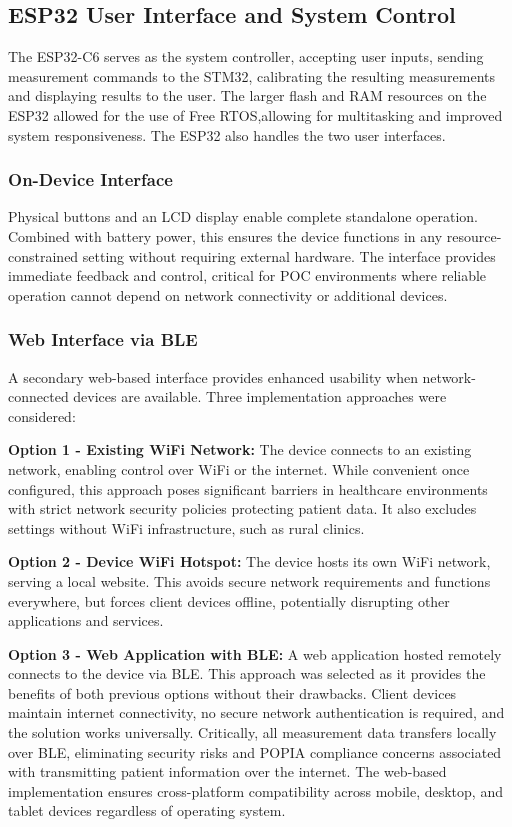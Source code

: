 \subsection{ESP32 User Interface and System Control}
The ESP32-C6 serves as the system controller, accepting user inputs, sending measurement commands to the STM32, calibrating the resulting measurements and displaying results to the user. The larger flash and RAM resources on the ESP32 allowed for the use of Free RTOS,allowing for multitasking and improved system responsiveness. The ESP32 also handles the two user interfaces.

\subsubsection{On-Device Interface}
Physical buttons and an LCD display enable complete standalone operation. Combined with battery power, this ensures the device functions in any resource-constrained setting without requiring external hardware. The interface provides immediate feedback and control, critical for \ac{POC} environments where reliable operation cannot depend on network connectivity or additional devices.

\subsubsection{Web Interface via BLE}
A secondary web-based interface provides enhanced usability when network-connected devices are available. Three implementation approaches were considered:

\textbf{Option 1 - Existing WiFi Network:} The device connects to an existing network, enabling control over WiFi or the internet. While convenient once configured, this approach poses significant barriers in healthcare environments with strict network security policies protecting patient data. It also excludes settings without WiFi infrastructure, such as rural clinics.

\textbf{Option 2 - Device WiFi Hotspot:} The device hosts its own WiFi network, serving a local website. This avoids secure network requirements and functions everywhere, but forces client devices offline, potentially disrupting other applications and services.

\textbf{Option 3 - Web Application with BLE:} A web application hosted remotely connects to the device via \ac{BLE}. This approach was selected as it provides the benefits of both previous options without their drawbacks. Client devices maintain internet connectivity, no secure network authentication is required, and the solution works universally. Critically, all measurement data transfers locally over \ac{BLE}, eliminating security risks and POPIA compliance concerns associated with transmitting patient information over the internet. The web-based implementation ensures cross-platform compatibility across mobile, desktop, and tablet devices regardless of operating system.

